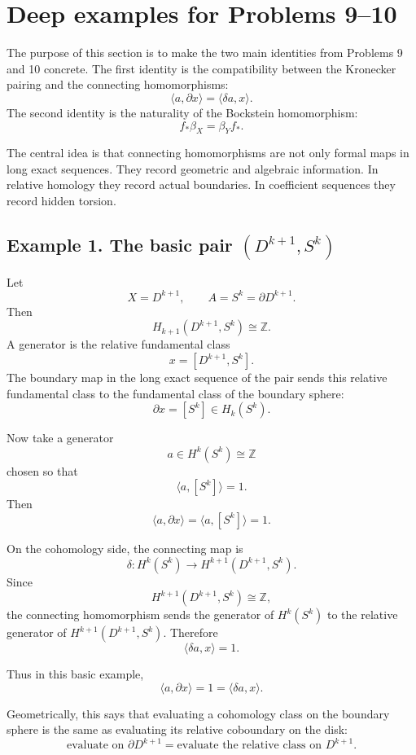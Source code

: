 \documentclass[12pt,a4paper]{article}
\theoremstyle{notespace}
\begin{document}
\section{Deep examples for Problems 9--10}

The purpose of this section is to make the two main identities from Problems 9 and 10 concrete. The first identity is the compatibility between the Kronecker pairing and the connecting homomorphisms:
\[
\boxed{
	\langle a,\partial x\rangle=\langle \delta a,x\rangle .
}
\]
The second identity is the naturality of the Bockstein homomorphism:
\[
\boxed{
	f_*\beta_X=\beta_Y f_* .
}
\]

The central idea is that connecting homomorphisms are not only formal maps in long exact sequences. They record geometric and algebraic information. In relative homology they record actual boundaries. In coefficient sequences they record hidden torsion.

\subsection{Example 1. The basic pair \texorpdfstring{\((D^{k+1},S^k)\)}{(D^{k+1}, S^k)}}

Let
\[
X=D^{k+1},
\qquad
A=S^k=\partial D^{k+1}.
\]
Then
\[
H_{k+1}(D^{k+1},S^k)\cong \mathbb Z.
\]
A generator is the relative fundamental class
\[
x=[D^{k+1},S^k].
\]
The boundary map in the long exact sequence of the pair sends this relative fundamental class to the fundamental class of the boundary sphere:
\[
\partial x=[S^k]\in H_k(S^k).
\]

Now take a generator
\[
a\in H^k(S^k)\cong \mathbb Z
\]
chosen so that
\[
\langle a,[S^k]\rangle=1.
\]
Then
\[
\langle a,\partial x\rangle
=
\langle a,[S^k]\rangle
=
1.
\]

On the cohomology side, the connecting map is
\[
\delta:H^k(S^k)\longrightarrow H^{k+1}(D^{k+1},S^k).
\]
Since
\[
H^{k+1}(D^{k+1},S^k)\cong \mathbb Z,
\]
the connecting homomorphism sends the generator of \(H^k(S^k)\) to the relative generator of \(H^{k+1}(D^{k+1},S^k)\). Therefore
\[
\langle \delta a,x\rangle=1.
\]

Thus in this basic example,
\[
\boxed{
	\langle a,\partial x\rangle
	=
	1
	=
	\langle \delta a,x\rangle.
}
\]

\medskip

Geometrically, this says that evaluating a cohomology class on the boundary sphere is the same as evaluating its relative coboundary on the disk:
\[
\boxed{
	\text{evaluate on }\partial D^{k+1}
	=
	\text{evaluate the relative class on }D^{k+1}.
}
\]
\end{document}
